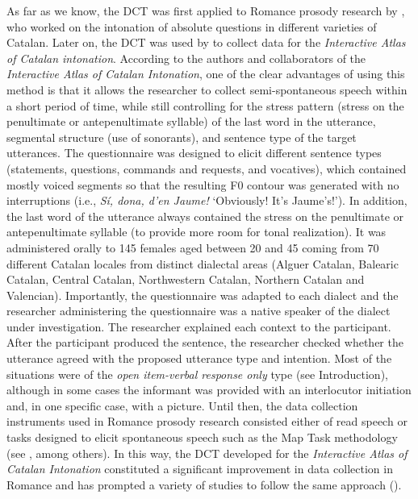 \documentclass[output=paper]{LSP/langsci}
\begin{document}
As far as we know, the DCT was first applied to Romance prosody research by \citet{Prieto.2001}, who worked on the intonation of absolute questions in different varieties of Catalan. Later on, the DCT was used by \citet{Prieto2007-2012} to collect data for the \textit{Interactive Atlas of Catalan intonation}. According to the authors and collaborators of the \textit{Interactive Atlas of Catalan Intonation}, one of the clear advantages of using this method is that it allows the researcher to collect semi-spontaneous speech within a short period of time, while still controlling for the stress pattern (stress on the penultimate or antepenultimate syllable) of the last word in the utterance, segmental structure (use of sonorants), and sentence type of the target utterances. The questionnaire was designed to elicit different sentence types (statements, questions, commands and requests, and vocatives), which contained mostly voiced segments so that the resulting F0 contour was generated with no interruptions (i.e., \textit{Sí, dona, d’en Jaume!} ‘Obviously! It’s Jaume’s!’). In addition, the last word of the utterance always contained the stress on the penultimate or antepenultimate syllable (to provide more room for tonal realization). It was administered orally to 145 females aged between 20 and 45 coming from 70 different Catalan locales from distinct dialectal areas (Alguer Catalan, Balearic Catalan, Central Catalan, Northwestern Catalan, Northern Catalan and Valencian). Importantly, the questionnaire was adapted to each dialect and the researcher administering the questionnaire was a native speaker of the dialect under investigation. The researcher explained each context to the participant. After the participant produced the sentence, the researcher checked whether the utterance agreed with the proposed utterance type and intention. Most of the situations were of the \textit{open item-verbal response only} type (see Introduction), although in some cases the informant was provided with an interlocutor initiation and, in one specific case, with a picture. Until then, the data collection instruments used in Romance prosody research consisted either of read speech or tasks designed to elicit spontaneous speech such as the Map Task methodology (see \citealt{Grice2003}, among others). In this way, the DCT developed for the \textit{Interactive Atlas of Catalan Intonation} constituted a significant improvement in data collection in Romance and has prompted a variety of studies to follow the same approach  (\citealt{Prieto2010,Brehm2014,frotaPrieto2015,Sichel-Bazin2015}). 
\end{document}
